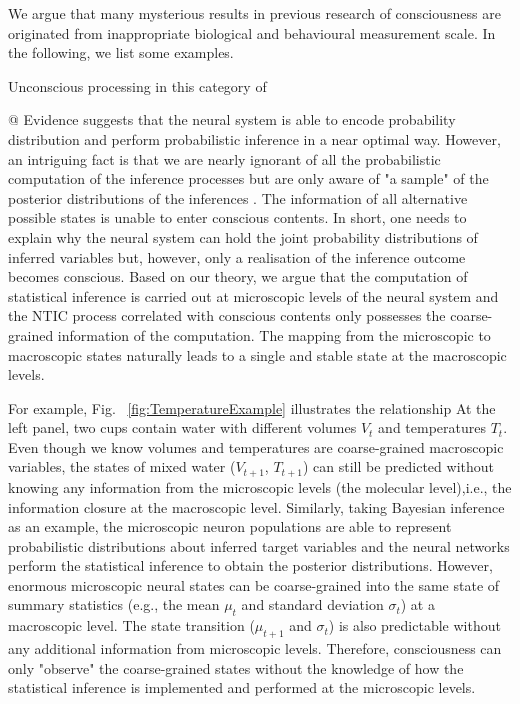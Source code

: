 \documentclass[utf8]{article}
\begin{document}
                
                We argue that many mysterious results in previous research of consciousness are originated from inappropriate biological and behavioural measurement scale. In the following, we list some examples. 
                
                
                Unconscious processing in this category of 
                
                @ Evidence suggests that the neural system is able to encode probability distribution and perform probabilistic inference in a near optimal way. However, an intriguing fact is that we are nearly ignorant of all the probabilistic computation of the inference processes but are only aware of "a sample" of the posterior distributions of the inferences \citep{dehaene2017consciousness, vul2009attention, asplund2014attentional, vul2008temporal, moreno2011bayesian}. The information of all alternative possible states is unable to enter conscious contents. In short, one needs to explain why the neural system can hold the joint probability distributions of inferred variables but, however, only a realisation of the inference outcome becomes conscious. Based on our theory, we argue that the computation of statistical inference is carried out at microscopic levels of the neural system and the NTIC process correlated with conscious contents only possesses the coarse-grained information of the computation. The mapping from the microscopic to macroscopic states naturally leads to a single and stable state at the macroscopic levels.
                
                For example, Fig.~ \ref{fig:TemperatureExample} illustrates the relationship 
                At the left panel, two cups contain water with different volumes $V_t$ and temperatures $T_t$. Even though we know volumes and temperatures are coarse-grained macroscopic variables, the states of mixed water ($V_{t+1}$, $T_{t+1}$) can still be predicted without knowing any information from the microscopic levels (the molecular level),i.e., the information closure at the macroscopic level. Similarly, taking Bayesian inference as an example, the microscopic neuron populations are able to represent probabilistic distributions about inferred target variables and the neural networks perform the statistical inference to obtain the posterior distributions. However, enormous microscopic neural states can be coarse-grained into the same state of summary statistics (e.g., the mean $\mu_{t}$  and standard deviation $\sigma_{t}$) at a macroscopic level. The state transition ($\mu_{t+1}$ and $\sigma_{t}$) is also predictable without any additional information from microscopic levels. Therefore, consciousness can only "observe" the coarse-grained states without the knowledge of how the statistical inference is implemented and performed at the microscopic levels. 
        
\end{document}
